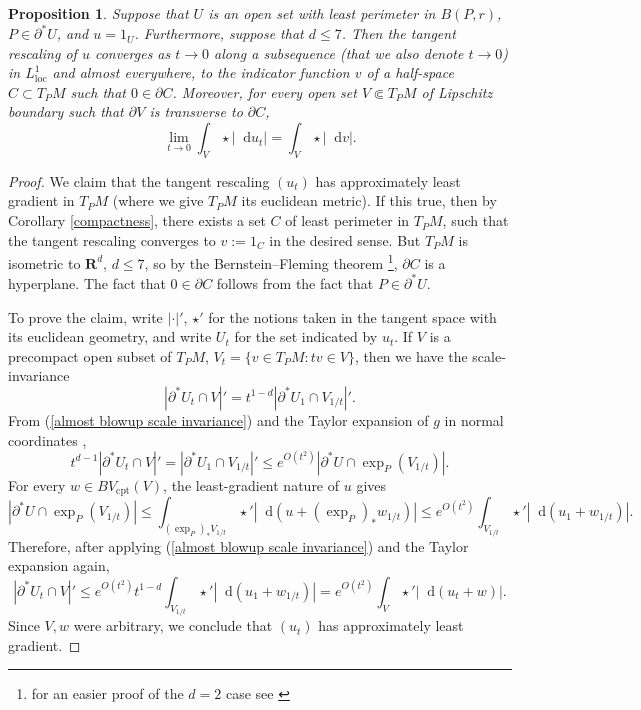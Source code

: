 \documentclass[reqno,12pt,letterpaper]{amsart}
\newcommand{\RR}{\mathbf{R}}
\newcommand*\dif{\mathop{}\!\mathrm{d}}
\newcommand{\loc}{\mathrm{loc}}
\newcommand{\cpt}{\mathrm{cpt}}
\newtheorem{proposition}[theorem]{Proposition}
\theoremstyle{definition}
\numberwithin{equation}{section}
\begin{document}
\begin{proposition}\label{blowup theorem}
Suppose that $U$ is an open set with least perimeter in $B(P, r)$, $P \in \partial^* U$, and $u = 1_U$.
Furthermore, suppose that $d \leq 7$.
Then the tangent rescaling of $u$ converges as $t \to 0$ along a subsequence (that we also denote $t \to 0$) in $L^1_\loc$ and almost everywhere, to the indicator function $v$ of a half-space $C \subset T_PM$ such that $0 \in \partial C$.
Moreover, for every open set $V \Subset T_PM$ of Lipschitz boundary such that $\partial V$ is transverse to $\partial C$,
$$\lim_{t \to 0} \int_V \star |\dif u_t| = \int_V \star |\dif v|.$$
\end{proposition}
\begin{proof}
We claim that the tangent rescaling $(u_t)$ has approximately least gradient in $T_PM$ (where we give $T_PM$ its euclidean metric). If this true, then by Corollary \ref{compactness}, there exists a set $C$ of least perimeter in $T_PM$, such that the tangent rescaling converges to $v := 1_C$ in the desired sense.
But $T_PM$ is isometric to $\RR^d$, $d \leq 7$, so by the Bernstein--Fleming theorem \cite[Theorem 17.3]{Giusti77}\footnote{for an easier proof of the $d = 2$ case see \cite[\S5]{Fleming62}}, $\partial C$ is a hyperplane.
The fact that $0 \in \partial C$ follows from the fact that $P \in \partial^* U$.

To prove the claim, write $|\cdot|'$, $\star'$ for the notions taken in the tangent space with its euclidean geometry, and write $U_t$ for the set indicated by $u_t$.
If $V$ is a precompact open subset of $T_PM$, $V_t = \{v \in T_PM: tv \in V\}$, then we have the scale-invariance
\begin{equation}\label{almost blowup scale invariance}
|\partial^* U_t \cap V|' = t^{1 - d}|\partial^* U_1 \cap V_{1/t}|'.
\end{equation}
From (\ref{almost blowup scale invariance}) and the Taylor expansion of $g$ in normal coordinates \cite[Lemma 3.4]{schoen1994lectures},
$$t^{d - 1} |\partial^* U_t \cap V|' = |\partial^* U_1 \cap V_{1/t}|' \leq e^{O(t^2)} |\partial^* U \cap \exp_P(V_{1/t})|.$$
For every $w \in BV_\cpt(V)$, the least-gradient nature of $u$ gives
$$|\partial^* U \cap \exp_P(V_{1/t})| \leq \int_{(\exp_P)_* V_{1/t}} \star '|\dif(u + (\exp_P)_* w_{1/t})| \leq e^{O(t^2)} \int_{V_{1/t}} \star'|\dif(u_1 + w_{1/t})|.$$
Therefore, after applying (\ref{almost blowup scale invariance}) and the Taylor expansion again,
$$|\partial^* U_t \cap V|' \leq e^{O(t^2)} t^{1 - d} \int_{V_{1/t}} \star' |\dif (u_1 + w_{1/t})| = e^{O(t^2)} \int_V \star' |\dif (u_t + w)|.$$
Since $V,w$ were arbitrary, we conclude that $(u_t)$ has approximately least gradient.
\end{proof}
\end{document}
